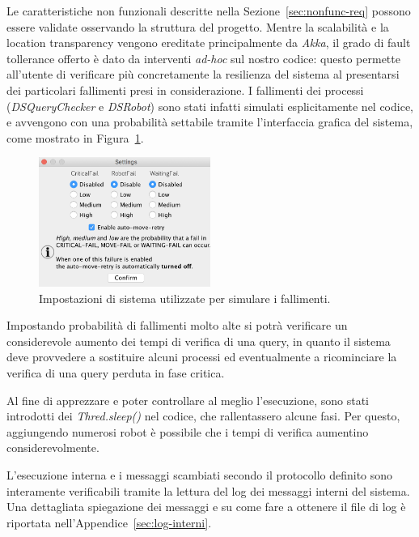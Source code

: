 Le caratteristiche non funzionali descritte nella Sezione~\ref{sec:nonfunc-req}
possono essere validate osservando la struttura del progetto.
Mentre la scalabilità e la location transparency vengono ereditate
principalmente da \emph{Akka},
il grado di fault tollerance offerto è dato da interventi \emph{ad-hoc}
sul nostro codice: questo permette all'utente di verificare più
concretamente la resilienza del sistema al presentarsi dei
particolari fallimenti presi in considerazione.
I fallimenti dei processi (\emph{DSQueryChecker} e \emph{DSRobot})
sono stati infatti simulati esplicitamente nel codice,
e avvengono con una probabilità settabile tramite l'interfaccia grafica
del sistema, come mostrato in Figura~\ref{fig:settings}.
\begin{figure}
	\centering
	\includegraphics[width=0.5\textwidth]{immagini/settings.png}
	\caption{\label{fig:settings}
        Impostazioni di sistema utilizzate per simulare i fallimenti.}
\end{figure}
Impostando probabilità di fallimenti molto alte si potrà verificare
un considerevole aumento dei tempi di verifica di una query,
in quanto il sistema deve provvedere a sostituire alcuni processi
ed eventualmente a ricominciare la verifica di una query perduta in
fase critica.

Al fine di apprezzare e poter controllare al meglio l'esecuzione,
sono stati introdotti dei \emph{Thred.sleep()} nel codice,
che rallentassero alcune fasi. Per questo, aggiungendo numerosi robot
è possibile che i tempi di verifica aumentino considerevolmente.

L'esecuzione interna e i messaggi scambiati secondo il protocollo
definito sono interamente verificabili tramite la lettura del
log dei messaggi interni del sistema.
Una dettagliata spiegazione dei messaggi e su come fare a ottenere
il file di log è riportata nell'Appendice~\ref{sec:log-interni}.

